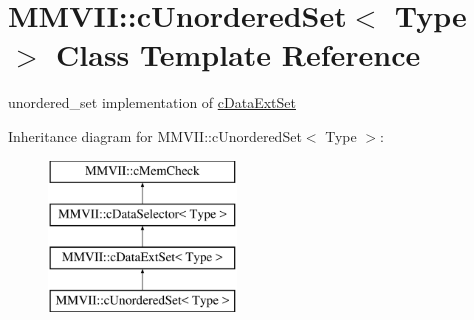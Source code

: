 \hypertarget{classMMVII_1_1cUnorderedSet}{}\section{M\+M\+V\+II\+:\+:c\+Unordered\+Set$<$ Type $>$ Class Template Reference}
\label{classMMVII_1_1cUnorderedSet}


unordered\+\_\+set implementation of \hyperlink{classMMVII_1_1cDataExtSet}{c\+Data\+Ext\+Set}  


Inheritance diagram for M\+M\+V\+II\+:\+:c\+Unordered\+Set$<$ Type $>$\+:\begin{figure}[H]
\begin{center}
\leavevmode
\includegraphics[height=4.000000cm]{classMMVII_1_1cUnorderedSet}
\end{center}
\end{figure}
